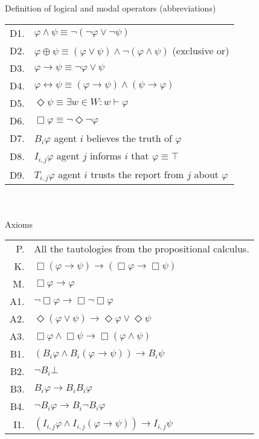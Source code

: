 \begin{table}[!t]
\centering
Definition of logical and modal operators (abbreviations) \\
\begin{tabular}{r l}
D1. & $\varphi \wedge \psi \equiv \neg ( \neg \varphi \vee \neg \psi)$\\
D2. & $\varphi \oplus \psi \equiv (\varphi \vee \psi) \wedge \neg(\varphi \wedge \psi)$ (exclusive or)\\
D3. & $\varphi \rightarrow \psi \equiv \neg \varphi \vee \psi $\\
D4. & $\varphi \leftrightarrow \psi \equiv (\varphi \rightarrow \psi) \wedge (\psi \rightarrow \varphi)$\\
D5. & $\Diamond \psi \equiv \exists w \in W : w \vdash \varphi $\\
D6. & $\Box \varphi \equiv \neg \Diamond \neg \varphi $\\
D7. & $B_i \varphi$ agent $i$ believes the truth of $\varphi$\\
D8. & $I_{i,j} \varphi$ agent $j$ informs $i$ that $\varphi \equiv \top$\\
D9. & $T_{i,j} \varphi$ agent $i$ trusts the report from $j$ about $\varphi$ \\
\end{tabular} \\~\\
Axioms \\
\begin{tabular}{r l}
P. & All the tautologies from the propositional calculus.\\
K. & $\Box (\varphi \rightarrow \psi) \rightarrow (\Box \varphi \rightarrow \Box \psi)$\\
M. & $\Box \varphi \rightarrow \varphi$\\
A1. & $\neg \Box \varphi \rightarrow \Box \neg \Box \varphi $\\
A2. & $\Diamond (\varphi \vee \psi) \rightarrow \Diamond \varphi \vee \Diamond \psi $\\
A3. & $\Box \varphi \wedge \Box \psi \rightarrow \Box (\varphi \wedge \psi)$ \\
B1. & $(B_i \varphi \wedge B_i (\varphi \rightarrow \psi )) \rightarrow B_i \psi$ \\
B2. & $\neg B_i \bot$\\
B3. & $B_i \varphi \rightarrow B_i B_i \varphi$ \\
B4. & $\neg B_i \varphi \rightarrow B_i \neg B_i \varphi$\\
I1. & $(I_{i,j} \varphi \wedge I_{i,j} (\varphi \rightarrow \psi )) \rightarrow I_{i,j} \psi$\\

\end{tabular}
\end{table}
